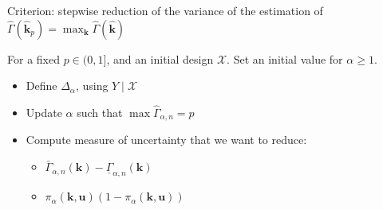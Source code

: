 \documentclass[a4paper,11pt]{article}
\theoremstyle{defi}
\numberwithin{thmCounter}{section}
\begin{document}
Criterion: stepwise reduction of the variance of the estimation of $\hat{\Gamma}(\hat{\mathbf{k}}_p) = \max_{\mathbf{k}}\hat{\Gamma}(\hat{\mathbf{k}})$

For a fixed $p\in (0, 1]$, and an initial design $\mathcal{X}$. Set an initial value for $\alpha \geq 1$. 
\begin{itemize}
\item Define $\Delta_{\alpha}$, using $Y \mid \mathcal{X}$
\item Update $\alpha$ such that $\max \hat{\Gamma}_{\alpha,n} = p$
\item Compute measure of uncertainty that we want to reduce:
  \begin{itemize}
  \item $\bar{\Gamma}_{\alpha,n}(\mathbf{k}) - \underline{\Gamma}_{\alpha,n}(\mathbf{k})$
  \item $\pi_{\alpha}(\mathbf{k},\mathbf{u})(1-\pi_{\alpha}(\mathbf{k},\mathbf{u}))$
  \end{itemize}
\end{itemize}







\end{document}
